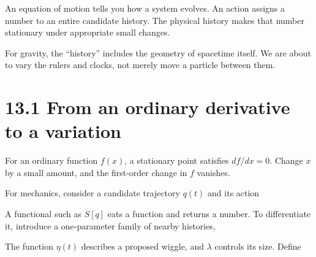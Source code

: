 \documentclass[
  11pt,
  letterpaper,
  oneside,
  openany]{scrbook}
\begin{document}
An equation of motion tells you how a system evolves. An action assigns
a number to an entire candidate history. The physical history makes that
number stationary under appropriate small changes.

For gravity, the ``history'' includes the geometry of spacetime itself.
We are about to vary the rulers and clocks, not merely move a particle
between them.

\hypertarget{from-an-ordinary-derivative-to-a-variation}{%
\section{13.1 From an ordinary derivative to a
variation}\label{from-an-ordinary-derivative-to-a-variation}}

For an ordinary function \(f(x)\), a stationary point satisfies
\(df/dx=0\). Change \(x\) by a small amount, and the first-order change
in \(f\) vanishes.

For mechanics, consider a candidate trajectory \(q(t)\) and its action

\begin{center}
\begingroup
{}
\ifdim\wd\grmathbox>\linewidth
\resizebox{\linewidth}{!}{\usebox{\grmathbox}}
\else\usebox{\grmathbox}\fi
\endgroup
\end{center}

A functional such as \(S[q]\) eats a function and returns a number. To
differentiate it, introduce a one-parameter family of nearby histories,

\begin{center}
\begingroup
{}
\ifdim\wd\grmathbox>\linewidth
\resizebox{\linewidth}{!}{\usebox{\grmathbox}}
\else\usebox{\grmathbox}\fi
\endgroup
\end{center}

The function \(\eta(t)\) describes a proposed wiggle, and \(\lambda\)
controls its size. Define

\begin{center}
\begingroup
{}
\ifdim\wd\grmathbox>\linewidth
\resizebox{\linewidth}{!}{\usebox{\grmathbox}}
\else\usebox{\grmathbox}\fi
\endgroup
\end{center}
\end{document}

